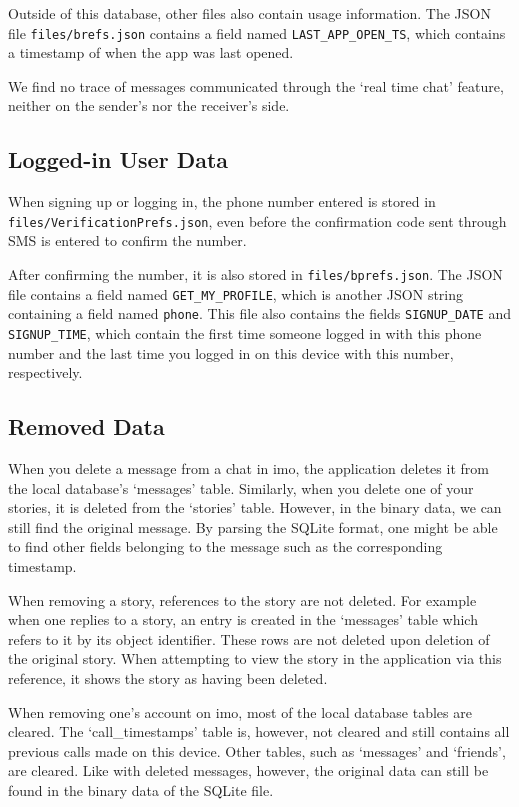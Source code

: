 \documentclass[conference]{IEEEtran}
\begin{document}
Outside of this database, other files also contain usage information. The JSON
file \texttt{files/brefs.json} contains a field named
\texttt{LAST\_APP\_OPEN\_TS}, which contains a timestamp of when the app was
last opened.

We find no trace of messages communicated through the `real time chat' feature,
neither on the sender's nor the receiver's side.


\subsection{Logged-in User Data}

When signing up or logging in, the phone number entered is stored in
\texttt{files/VerificationPrefs.json}, even before the confirmation code sent
through SMS is entered to confirm the number.

After confirming the number, it is also stored in \texttt{files/bprefs.json}.
The JSON file contains a field named \texttt{GET\_MY\_PROFILE}, which is another
JSON string containing a field named \texttt{phone}. This file also contains
the fields \texttt{SIGNUP\_DATE} and \texttt{SIGNUP\_TIME}, which contain the
first time someone logged in with this phone number and the last time you
logged in on this device with this number, respectively.


\subsection{Removed Data}

When you delete a message from a chat in imo, the application deletes it from
the local database's `messages' table. Similarly, when you delete one of your
stories, it is deleted from the `stories' table. However, in the binary
data, we can still find the original message. By parsing the SQLite format, one
might be able to find other fields belonging to the message such as the
corresponding timestamp.

When removing a story, references to the story are not deleted. For example
when one replies to a story, an entry is created in the `messages' table which
refers to it by its object identifier. These rows are not deleted upon deletion of the
original story. When attempting to view the story in the application via this reference, it shows
the story as having been deleted.

When removing one's account on imo, most of the local database tables are
cleared. The `call\_timestamps' table is, however, not cleared and still
contains all previous calls made on this device. Other tables, such as
`messages' and `friends', are cleared. Like with deleted messages, however, the
original data can still be found in the binary data of the SQLite file.
\end{document}
